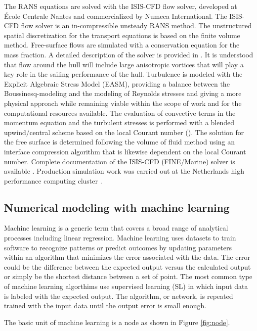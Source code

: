 \documentclass[twoside,twocolumn]{article}
\begin{document}
The RANS equations are solved with the ISIS-CFD flow solver, developed at \'{E}cole Centrale Nantes and commercialized by Numeca International. The ISIS-CFD flow solver is an in-compressible unsteady RANS method. The unstructured spatial discretization for the transport equations is based on the finite volume method. Free-surface flows are simulated with a conservation equation for the mass fraction. A detailed description of the solver is provided in \cite{Den05,Den06,Que07,Duv03}. It is understood that flow around the hull will include large anisotropic vortices that will play a key role in the sailing performance of the hull. Turbulence is modeled with the Explicit Algebraic Stress Model (EASM), providing a balance between the Boussinesq-modeling and the modeling of Reynolds stresses and giving a more physical approach while remaining viable within the scope of work and for the computational resources available. The evaluation of convective terms in the momentum equation and the turbulent stresses is performed with a blended upwind/central scheme based on the local Courant number (\Co). The solution for the free surface is determined following the volume of fluid method using an interface compression algorithm that is likewise dependent on the local Courant number. Complete documentation of the ISIS-CFD (FINE/Marine) solver is available \cite{Numeca1}. Production simulation work was carried out at the Netherlands high performance computing cluster \cite{SARA1}.

\subsection{Numerical modeling with machine learning}

Machine learning is a generic term that covers a broad range of analytical processes including linear regression. Machine learning uses datasets to train software to recognize patterns or predict outcomes by updating parameters within an algorithm that minimizes the error associated with the data. The error could be the difference between the expected output versus the calculated output or simply be the shortest distance between a set of point. The most common type of machine learning algorthims use supervised learning (SL) in which input data is labeled with the expected output. The algorithm, or network, is repeated trained with the input data until the output error is small enough.

The basic unit of machine learning is a node as shown in  Figure \ref{fig:node}.
\end{document}
